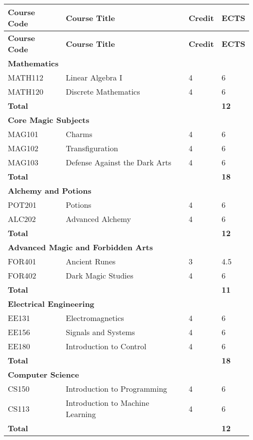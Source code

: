 \documentclass{report}
\begin{document}
\begin{longtable}{|p{3cm}|p{7.5cm}|p{1.5cm}|p{1.5cm}|}
\hline
\textbf{Course Code} & \textbf{Course Title} & \textbf{Credit} & \textbf{ECTS} \\ \hline
\endfirsthead %

\hline
\textbf{Course Code} & \textbf{Course Title} & \textbf{Credit} & \textbf{ECTS} \\ \hline
\endhead
\multicolumn{4}{|l|}{\textbf{Mathematics}} \\ \hline
MATH112 & Linear Algebra I & 4 & 6 \\ \hline
MATH120 & Discrete Mathematics & 4 & 6 \\ \hline
\textbf{Total} & & & \textbf{12}\\ \hline

\multicolumn{4}{|l|}{\textbf{Core Magic Subjects}} \\ \hline
MAG101 & Charms & 4 & 6 \\ \hline
MAG102 & Transfiguration & 4 & 6 \\ \hline
MAG103 & Defense Against the Dark Arts & 4 & 6 \\ \hline
\textbf{Total} & & & \textbf{18} \\ \hline

\multicolumn{4}{|l|}{\textbf{Alchemy and Potions}} \\ \hline
POT201 & Potions & 4 & 6 \\ \hline
ALC202 & Advanced Alchemy & 4 & 6 \\ \hline
\textbf{Total} & & & \textbf{12} \\ \hline

\multicolumn{4}{|l|}{\textbf{Advanced Magic and Forbidden Arts}} \\ \hline
FOR401 & Ancient Runes & 3 & 4.5 \\ \hline
FOR402 & Dark Magic Studies & 4 & 6 \\ \hline
\textbf{Total} & & & \textbf{11} \\ \hline

\multicolumn{4}{|l|}{\textbf{Electrical Engineering}} \\ \hline
EE131   & Electromagnetics & 4 & 6 \\ \hline
EE156   & Signals and Systems & 4 & 6 \\ \hline
EE180   & Introduction to Control & 4 & 6 \\ \hline
\textbf{Total} & & & \textbf{18}\\ \hline

\multicolumn{4}{|l|}{\textbf{Computer Science}} \\ \hline
CS150   & Introduction to Programming & 4 & 6 \\ \hline
CS113   & Introduction to Machine Learning & 4 & 6 \\ \hline
\textbf{Total} & & & \textbf{12}\\ \hline

\end{longtable}
\end{document}
